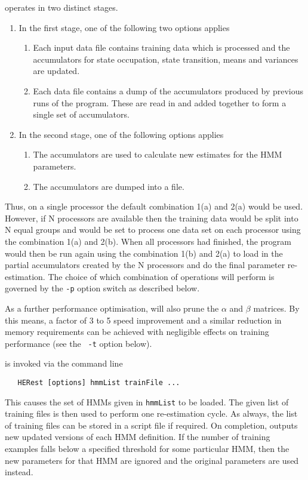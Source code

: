  operates in two distinct stages. 
\begin{enumerate}

\item
    In the first stage, one of the following two options applies
 \begin{enumerate}
  \item        
    Each input data file contains training data which is 
    processed and the accumulators for state occupation, 
    state transition, means and variances are updated.
        
  \item      
    Each data file contains a dump of the accumulators
    produced by previous runs of the program.  These
    are read in and added together to form a single set
    of accumulators.
  \end{enumerate}

\item
   In the second stage, one of the following options applies
  \begin{enumerate}
    \item
         The accumulators are used to calculate new 
         estimates for the HMM parameters.
    \item
         The accumulators are dumped into a file.
  \end{enumerate}
\end{enumerate}

Thus, on a single processor the default combination 1(a) and 2(a) would
be used.  However, if N processors are available then the 
training data would be split into N equal groups and  would
be set to process one data set on each processor using the combination
1(a) and 2(b). 
When all processors had finished, the 
program would then be run again using the combination 1(b) and 2(a)
to load in the partial accumulators created by the N processors
and do the final parameter re-estimation.  The choice of which combination
of operations  will perform is governed by the {\tt -p} option
switch as described below.

As a further performance optimisation,  will also prune the
$\alpha$ and $\beta$ matrices.  By this means, a factor of 3 to 5
speed improvement and a similar reduction in memory requirements can be
achieved with negligible effects on training performance (see the {\tt
-t} option below).  


 is invoked via the command line
\begin{verbatim}
   HERest [options] hmmList trainFile ...
\end{verbatim}
This causes the set of HMMs given in {\tt hmmList} to be loaded.
The given list of
training files is then used to perform one re-estimation cycle. As always,
the list of training files can be stored in a script file if required.  On
completion,  outputs new updated versions of each HMM definition. If
the number of training examples falls below a specified threshold 
for some particular HMM, then
the new parameters for that HMM are ignored and the original parameters are used 
instead.

